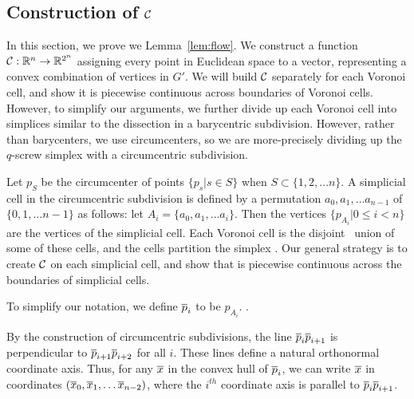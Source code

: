 \subsection{Construction of $\mathcal{C}$}

In this section, we prove we Lemma~\ref{lem:flow}. We construct a function
$\mathcal{C}:\mathbb{R}^n \rightarrow \mathbb{R}^{2^n}$ assigning every point in
Euclidean space to a vector, representing a convex combination of vertices
in $G'$. We will build $\mathcal{C}$ separately for each Voronoi cell, and show
it is piecewise continuous across boundaries of Voronoi cells. 
However, to simplify our arguments, we further divide up each Voronoi cell
into simplices similar to the dissection in a barycentric subdivision.
However, rather than barycenters, we use circumcenters, so we are
more-precisely dividing up the $q$-screw simplex with a circumcentric
subdivision. 

Let $p_{S}$ be the circumcenter of points $\{p_s | s \in S\}$ when $S
\subset \{1, 2, \ldots n\}$. A simplicial cell in the circumcentric subdivision is
defined by a permutation $a_0, a_1, \ldots a_{n-1}$ of $\{0, 1, \ldots
n-1\}$ as follows: let
$A_i = \{a_0, a_1, \ldots a_{i}\}$. Then the vertices $\{p_{A_i} | 0 \leq i
< n\}$ are the vertices of the simplicial cell.   Each Voronoi cell is the disjoint~ union of some of
these cells, and the cells partition the simplex . Our general strategy is to
create $\mathcal{C}$ on each simplicial cell, and show that is piecewise
continuous across the boundaries of simplicial cells.

To simplify our notation, we define $\overline{p}_i$ to be $p_{A_i}$. .



By the construction of circumcentric subdivisions, 
the line $\overline{p}_{i}\overline{p}_{i+1}$ is perpendicular to
$\overline{p}_{i+1}\overline{p}_{i+2}$ for all $i$. These lines define a natural
orthonormal coordinate axis. Thus,
for any $\overline{x}$ in the convex hull of $\overline{p}_i$, we can write $\overline{x}$ in
coordinates $(\overline{x}_0, \overline{x}_1, \ldots \overline{x}_{n-2})$, where the $i^{th}$ coordinate
axis is parallel to $\overline{p}_i \overline{p}_{i+1}$.

